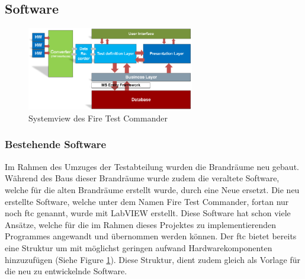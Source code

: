 \documentclass[10pt]{scrartcl}
\begin{document}
\subsection{Software}
\begin{figure}
	\begin{center}
		\includegraphics[width=0.65\textwidth]{pictures/SystemviewFTC}
		\caption{Systemview des Fire Test Commander}
		\label{fig:SystemViewFTC}
	\end{center}
\end{figure}
\subsubsection{Bestehende Software}
Im Rahmen des Umzuges der Testabteilung wurden die Brandräume neu gebaut. Während des Baus dieser Brandräume wurde zudem die veraltete Software, welche für die alten Brandräume erstellt wurde, durch eine Neue ersetzt. Die neu erstellte Software, welche unter dem Namen Fire Test Commander, fortan nur noch \acrshort{ftc} genannt, wurde mit \gls{LabVIEW} erstellt. Diese Software hat schon viele Ansätze, welche für die im Rahmen dieses Projektes zu implementierenden Programmes angewandt und übernommen werden können. Der \acrshort{ftc} bietet bereits eine Struktur um mit möglichst geringen aufwand Hardwarekomponenten hinzuzufügen (Siehe Figure \ref{fig:SystemViewFTC}). Diese Struktur, dient zudem gleich als Vorlage für die neu zu entwickelnde Software.
\newpage
\end{document}
